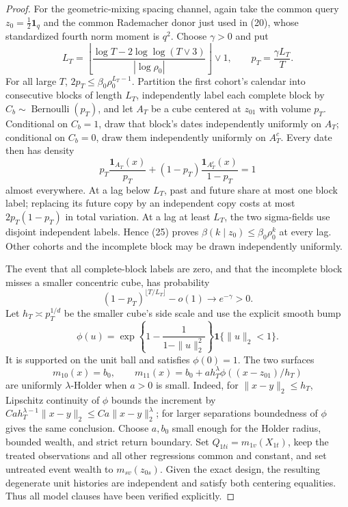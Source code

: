 \documentclass{article}
\begin{document}
\begin{proof}
For the geometric-mixing spacing channel, again take the common query
\(z_0=\tfrac12\mathbf1_q\) and the common Rademacher donor just used in
(20), whose standardized fourth norm moment is \(q^2\).  Choose
\(\gamma>0\) and put
\[
 L_T=\left\lfloor
 \frac{\log T-2\log\log(T\vee3)}{|\log\rho_0|}
 \right\rfloor\vee1,
 \qquad p_T=\frac{\gamma L_T}{T}.                             \tag{25}
\]
For all large \(T\),
\(2p_T\le\beta_0\rho_0^{L_T-1}\).  Partition the first cohort's calendar
into consecutive blocks of length \(L_T\), independently label each complete
block by \(C_b\sim\operatorname{Bernoulli}(p_T)\), and let \(A_T\) be a
cube centered at \(z_{01}\) with volume \(p_T\).  Conditional on \(C_b=1\),
draw that block's dates independently uniformly on \(A_T\); conditional on
\(C_b=0\), draw them independently uniformly on \(A_T^c\).  Every date then
has density
\[
 p_T\frac{\mathbf1_{A_T}(x)}{p_T}
 +(1-p_T)\frac{\mathbf1_{A_T^c}(x)}{1-p_T}=1                 \tag{26}
\]
almost everywhere.  At a lag below \(L_T\), past and future share at most
one block label; replacing its future copy by an independent copy costs at
most \(2p_T(1-p_T)\) in total variation.  At a lag at least \(L_T\), the
two sigma-fields use disjoint independent labels.  Hence (25) proves
\(\beta(k\mid z_0)\le\beta_0\rho_0^k\) at every lag.  Other cohorts and the
incomplete block may be drawn independently uniformly.

The event that all complete-block labels are zero, and that the incomplete
block misses a smaller concentric cube, has probability
\[
 (1-p_T)^{\lfloor T/L_T\rfloor}-o(1)\longrightarrow e^{-\gamma}>0. \tag{27}
\]
Let \(h_T\asymp p_T^{1/d}\) be the smaller cube's side scale and use the
explicit smooth bump
\[
 \phi(u)=
 \exp\!\left\{1-\frac{1}{1-\|u\|_2^2}\right\}
 \mathbf1\{\|u\|_2<1\}.
\]
It is supported on the unit ball and satisfies \(\phi(0)=1\).  The two
surfaces
\[
 m_{10}(x)=b_0,\qquad
 m_{11}(x)=b_0+ah_T^\lambda
                \phi((x-z_{01})/h_T)                         \tag{28}
\]
are uniformly \(\lambda\)-Holder when \(a>0\) is small.  Indeed, for
\(\|x-y\|_2\le h_T\), Lipschitz continuity of \(\phi\) bounds the increment
by \(Ca h_T^{\lambda-1}\|x-y\|_2\le Ca\|x-y\|_2^\lambda\);
for larger separations boundedness of \(\phi\) gives the same conclusion.
Choose \(a,b_0\) small enough for the Holder radius, bounded wealth, and
strict return boundary.  Set \(Q_{1ti}=m_{1v}(X_{1t})\), keep the treated
observations and all other regressions common and constant, and set untreated
event wealth to \(m_{sv}(z_{0s})\).  Given the exact design, the resulting
degenerate unit histories are independent and satisfy both centering
equalities.  Thus all model clauses have been verified explicitly.


\end{proof}
\end{document}

